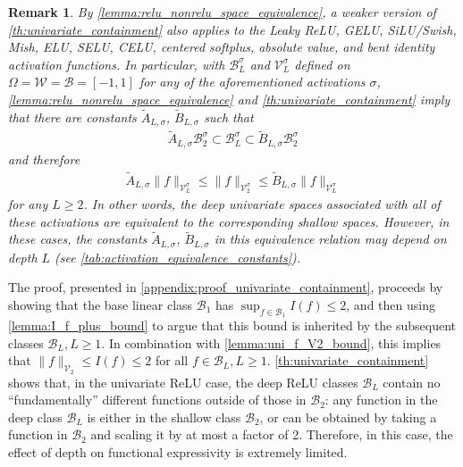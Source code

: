 \documentclass{article}
\def\cB{{\mathcal{B}}}
\def\cV{{\mathcal{V}}}
\def\cW{{\mathcal{W}}}
\newtheorem{remark}[theorem]{Remark}
\begin{document}
\begin{remark}
    By \cref{lemma:relu_nonrelu_space_equivalence}, a weaker version of \cref{th:univariate_containment} also applies to the Leaky ReLU, GELU, SiLU/Swish, Mish, ELU, SELU, CELU, centered softplus, absolute value, and bent identity activation functions. In particular, with $\cB_L^\sigma$ and $\cV_L^\sigma$ defined on $\Omega = \cW = \cB = [-1,1]$ for any of the aforementioned activations $\sigma$, \cref{lemma:relu_nonrelu_space_equivalence} and \cref{th:univariate_containment} imply that there are constants $\widetilde{A}_{L, \sigma}$, $\widetilde{B}_{L, \sigma}$ such that 
    \begin{align}
        \widetilde{A}_{L, \sigma} \cB_2^\sigma \subset \cB_L^\sigma \subset \widetilde{B}_{L, \sigma} \cB_2^\sigma
    \end{align}
    and therefore
    \begin{align}
        \widetilde{A}_{L, \sigma} \| f \|_{\cV_L^\sigma} \leq \| f \|_{\cV_2^\sigma} \leq \widetilde{B}_{L, \sigma} \| f \|_{\cV_L^\sigma}
    \end{align}
    for any $L \geq 2$. In other words, the deep univariate spaces associated with all of these activations are equivalent to the corresponding shallow spaces. However, in these cases, the constants $\widetilde{A}_{L, \sigma}$, $\widetilde{B}_{L, \sigma}$ in this equivalence relation may depend on depth $L$ (see \cref{tab:activation_equivalence_constants}).
\end{remark}

The proof, presented in \cref{appendix:proof_univariate_containment}, proceeds by showing that the base linear class $\cB_1$ has $\sup_{f \in \cB_1} I(f) \leq 2$, and then using \cref{lemma:I_f_plus_bound} to argue that this bound is inherited by the subsequent classes $\cB_L, L \geq 1$. In combination with \cref{lemma:uni_f_V2_bound}, this implies that $\| f \|_{\cV_2} \leq I(f) \leq 2$ for all $f \in \cB_L, L \geq 1$. \cref{th:univariate_containment} shows that, in the univariate ReLU case, the deep ReLU classes $\cB_L$ contain no ``fundamentally'' different functions outside of those in $\cB_2$: any function in the deep class $\cB_L$ is either in the shallow class $\cB_2$, or can be obtained by taking a function in $\cB_2$ and scaling it by at most a factor of 2. Therefore, in this case, the effect of depth on functional expressivity is extremely limited. 
\end{document}
